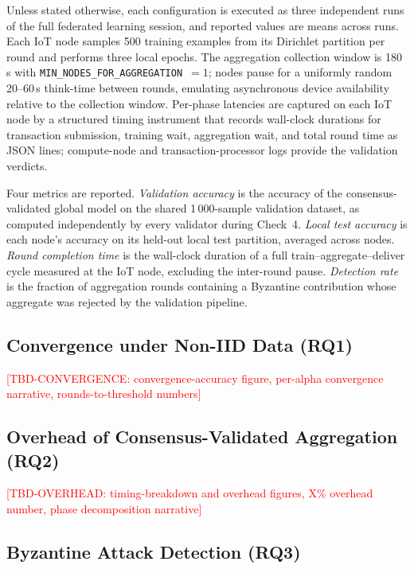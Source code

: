 \documentclass[lettersize,journal]{IEEEtran}
\begin{document}
Unless stated otherwise, each configuration is executed as three independent runs of
the full federated learning session, and reported values are means across runs. Each
IoT node samples 500 training examples from its Dirichlet partition per round and
performs three local epochs. The aggregation collection window is 180\,s with
\texttt{MIN\_NODES\_FOR\_AGGREGATION}~$=1$; nodes pause for a uniformly random
20--60\,s think-time between rounds, emulating asynchronous device availability
relative to the collection window. Per-phase latencies are captured on each IoT node
by a structured timing instrument that records wall-clock durations for transaction
submission, training wait, aggregation wait, and total round time as JSON lines;
compute-node and transaction-processor logs provide the validation verdicts.

Four metrics are reported. \emph{Validation accuracy} is the accuracy of the
consensus-validated global model on the shared 1\,000-sample validation dataset, as
computed independently by every validator during Check~4. \emph{Local test accuracy}
is each node's accuracy on its held-out local test partition, averaged across nodes.
\emph{Round completion time} is the wall-clock duration of a full
train--aggregate--deliver cycle measured at the IoT node, excluding the inter-round
pause. \emph{Detection rate} is the fraction of aggregation rounds containing a
Byzantine contribution whose aggregate was rejected by the validation pipeline.

\subsection{Convergence under Non-IID Data (RQ1)}
\label{sec:eval-convergence}

\textcolor{red}{[TBD-CONVERGENCE: convergence-accuracy figure, per-alpha convergence
narrative, rounds-to-threshold numbers]}

\subsection{Overhead of Consensus-Validated Aggregation (RQ2)}
\label{sec:eval-overhead}

\textcolor{red}{[TBD-OVERHEAD: timing-breakdown and overhead figures, X\% overhead
number, phase decomposition narrative]}

\subsection{Byzantine Attack Detection (RQ3)}
\label{sec:eval-byzantine}
\end{document}
